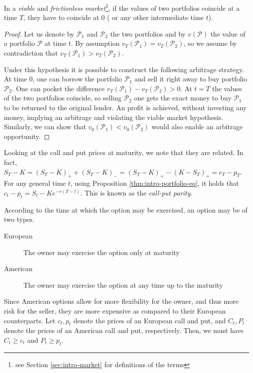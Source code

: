\begin{prp}
	\label{thm:intro-portfolio-eq}
	In a \emph{viable} and \emph{frictionless market}\footnote{see Section \ref{sec:intro-market} for definitions of the terms}, if the values of two portfolios coincide at a time $ T $, they have to coincide at $ 0 $ ( or any other intermediate time $ t $).
\end{prp}

\begin{proof}
	Let us denote by $ \mathcal{P}_1 $ and $ \mathcal{P}_2 $ the two portfolios and by $ v(\mathcal{P}) $ the value of a portfolio $ \mathcal{P} $ at time $ t $. By assumption $ v_T (\mathcal{P}_1) = v_T (\mathcal{P}_2) $, so we assume by contradiction that $ v_T (\mathcal{P}_1) > v_T (\mathcal{P}_2) $.
	
	Under this hypothesis it is possible to construct the following arbitrage strategy. At time 0, one can borrow the portfolio $ \mathcal{P}_1 $ and sell it right away to buy portfolio $ \mathcal{P}_2 $. One can pocket the difference $ v_T (\mathcal{P}_1) - v_T (\mathcal{P}_2) > 0 $. At $ t = T $ the values of the two portfolios coincide, so selling $ \mathcal{P}_2 $ one gets the exact money to buy $ \mathcal{P}_1 $ to be returned to the original lender. An profit is achieved, without investing any money, implying an arbitrage and violating the viable market hypothesis. Similarly, we can show that $ v_0 (\mathcal{P}_1) < v_0 (\mathcal{P}_2) $ would also enable an arbitrage opportunity.
\end{proof}


Looking at the call and put prices at maturity, we note that they are related. In fact, $ S_T - K = (S_T - K)_+ + (S_T - K)_- = (S_T - K)_+ - (K - S_T)_+ = c_T - p_T $. For any general time $ t $, using Proposition \ref{thm:intro-portfolio-eq}, it holds that $ c_t - p_t = S_t - K e^{- r (T-t) } $. This is known as the \emph{call-put parity}.

According to the time at which the option may be exercised, an option may be of two types.
\begin{description}
	\item[European] The owner may exercise the option only at maturity
	\item[American] The owner may exercise the option at any time up to the maturity
\end{description}
Since American options allow for more flexibility for the owner, and thus more risk for the seller, they are more expensive as compared to their European counterparts. Let $ c_t, p_t $ denote the prices of an European call and put, and $ C_t, P_t $ denote the prices of an American call and put, respectively. Then, we must have $ C_t \ge c_t $ and $ P_t \ge p_t $.

